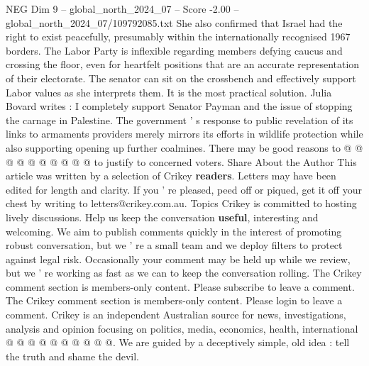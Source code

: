 \begin{textsample}{NEG Dim 9 – global\_north\_2024\_07 – Score -2.00 – global\_north\_2024\_07/109792085.txt}
She also confirmed that Israel had the right to exist peacefully, presumably within the internationally recognised 1967 borders.
The Labor Party is inflexible regarding members defying caucus and crossing the floor, even for heartfelt positions that are an accurate representation of their electorate.
The senator can sit on the crossbench and effectively support Labor values as she interprets them.
It is the most practical solution.
Julia Bovard writes : I completely support Senator Payman and the issue of stopping the carnage in Palestine.
The government ' s response to public revelation of its links to armaments providers merely mirrors its efforts in wildlife protection while also supporting opening up further coalmines.
There may be good reasons to @ @ @ @ @ @ @ @ @ @ to justify to concerned voters.
Share About the Author This article was written by a selection of Crikey \textbf{readers}.
Letters may have been edited for length and clarity.
If you ' re pleased, peed off or piqued, get it off your chest by writing to letters@crikey.com.au.
Topics Crikey is committed to hosting lively discussions.
Help us keep the conversation \textbf{useful}, interesting and welcoming.
We aim to publish comments quickly in the interest of promoting robust conversation, but we ' re a small team and we deploy filters to protect against legal risk.
Occasionally your comment may be held up while we review, but we ' re working as fast as we can to keep the conversation rolling.
The Crikey comment section is members-only content.
Please subscribe to leave a comment.
The Crikey comment section is members-only content.
Please login to leave a comment.
Crikey is an independent Australian source for news, investigations, analysis and opinion focusing on politics, media, economics, health, international @ @ @ @ @ @ @ @ @ @.
We are guided by a deceptively simple, old idea : tell the truth and shame the devil.

\end{textsample}
